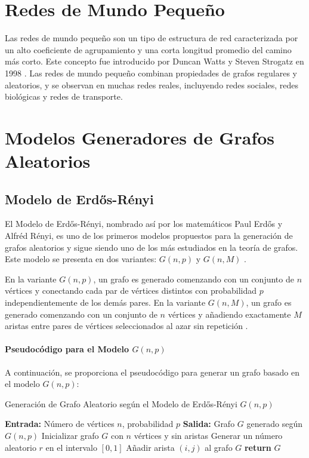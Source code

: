 \section{Redes de Mundo Pequeño}

Las redes de mundo pequeño son un tipo de estructura de red caracterizada por un alto coeficiente de agrupamiento y una corta longitud promedio del camino más corto. Este concepto fue introducido por Duncan Watts y Steven Strogatz en 1998 \citep{watts1998collective}. Las redes de mundo pequeño combinan propiedades de grafos regulares y aleatorios, y se observan en muchas redes reales, incluyendo redes sociales, redes biológicas y redes de transporte.



\section{Modelos Generadores de Grafos Aleatorios}

\subsection{Modelo de Erdős-Rényi}

El Modelo de Erdős-Rényi, nombrado así por los matemáticos Paul Erdős y Alfréd Rényi, es uno de los primeros modelos propuestos para la generación de grafos aleatorios y sigue siendo uno de los más estudiados en la teoría de grafos. Este modelo se presenta en dos variantes: $G(n, p)$ y $G(n, M)$ .

En la variante $G(n, p)$, un grafo es generado comenzando con un conjunto de $n$ vértices y conectando cada par de vértices distintos con probabilidad $p$ independientemente de los demás pares. En la variante $G(n, M)$, un grafo es generado comenzando con un conjunto de $n$ vértices y añadiendo exactamente $M$ aristas entre pares de vértices seleccionados al azar sin repetición \citep{Erdos1959} .

\paragraph{Pseudocódigo para el Modelo $G(n, p)$}

A continuación, se proporciona el pseudocódigo para generar un grafo basado en el modelo $G(n, p)$:

\begin{algorithm}
\caption{Generación de Grafo Aleatorio según el Modelo de Erdős-Rényi $G(n, p)$}
\begin{algorithmic}[1]
\State \textbf{Entrada:} Número de vértices $n$, probabilidad $p$
\State \textbf{Salida:} Grafo $G$ generado según $G(n, p)$
    \State Inicializar grafo $G$ con $n$ vértices y sin aristas
        \State Generar un número aleatorio $r$ en el intervalo $[0, 1]$
            \State Añadir arista $(i, j)$ al grafo $G$
        \EndIf
    \EndFor
    \State \textbf{return} $G$
\EndProcedure
\end{algorithmic}
\end{algorithm}


